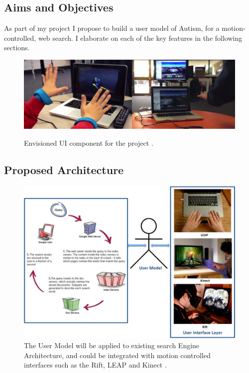 \documentclass[a4paper, 11pt]{article}
\begin{document}
\begin{justify}
\section{Aims and Objectives} 
As part of my project I propose to build a user model of Autism, for a motion-controlled, web search. I elaborate on each of the key features in the following sections. 

\begin{figure}[H]
\begin{center}
\includegraphics[scale=0.5]{vision}\\
\caption{Envisioned UI component for the project \cite{leap}.}
\label{vision}
\end{center}
\end{figure}

\subsection{Proposed Architecture}\label{proposed}
\begin{figure}[H]
\begin{center}
    \includegraphics[scale=0.3]{searchEngArchi}
    \caption{The User Model will be applied to existing search Engine Architecture\cite{seimage}, and could be integrated with motion controlled interfaces such as the Rift, LEAP and Kinect \cite{rift, leap, kinect}.}
    \label{architec}
\end{center}
\end{figure}



\end{justify}
\end{document}

